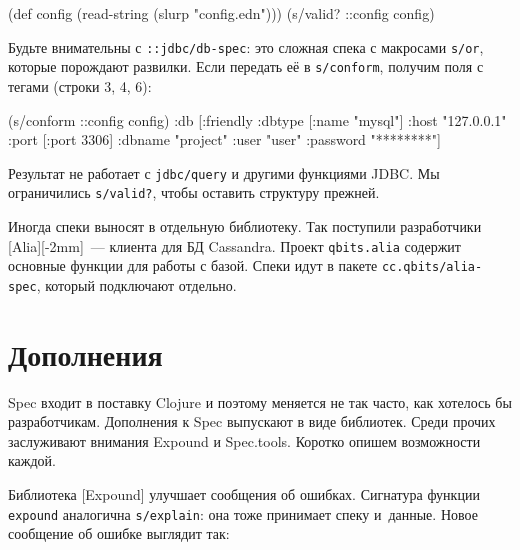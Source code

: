 \else

\begin{english}
  \begin{clojure}
(def config (read-string (slurp "config.edn")))
(s/valid? ::config config)
  \end{clojure}
\end{english}

\fi

\label{jdbc-conform-warning}


Будьте внимательны с \verb|::jdbc/db-spec|: это сложная спека с макросами
\verb|s/or|, которые порождают развилки. Если передать её в
\verb|s/conform|, получим поля с тегами (строки 3, 4, 6):

\begin{english}
  \begin{clojure/lines}
(s/conform ::config config)
{:db
 [:friendly
  {:dbtype   [:name "mysql"]
   :host     "127.0.0.1"
   :port     [:port 3306]
   :dbname   "project"
   :user     "user"
   :password "********"}]}
  \end{clojure/lines}
\end{english}

Результат не работает с \verb|jdbc/query| и другими функциями JDBC. Мы
ограничились \verb|s/valid?|, чтобы оставить структуру прежней.

Иногда спеки выносят в отдельную библиотеку. Так поступили разработчики
[Alia][-2mm]~--- клиента для БД
Cassandra. Проект \verb|qbits.alia| содержит основные функции для работы с
базой. Спеки идут в пакете \verb|cc.qbits/alia-spec|, который подключают
отдельно.

\section{Дополнения}

Spec входит в поставку Clojure и поэтому меняется не так часто, как хотелось бы
разработчикам. Дополнения к Spec выпускают в виде библиотек. Среди прочих
заслуживают внимания Expound и Spec.tools. Коротко опишем возможности каждой.


Библиотека [Expound] улучшает сообщения об
ошибках. Сигнатура функции \verb|expound| аналогична \verb|s/explain|: она
тоже принимает спеку и~данные. Новое сообщение об ошибке выглядит так:

